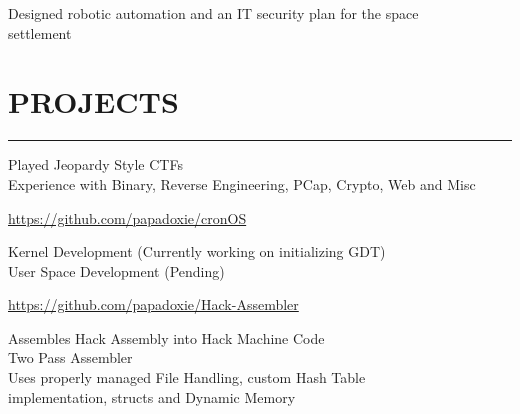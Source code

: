 \documentclass[]{resume}
\begin{document}
\begin{minipage}[t]{0.66\textwidth}
     
    \vspace{4pt}
    \begin{minipage}{0.85\textwidth\vspace{4pt}}
        Designed robotic automation and an IT security plan for the space\\settlement
    \end{minipage}



    \section{PROJECTS}
    \noindent\rule{12.80cm}{0.4pt}

     
    \vspace{4pt}
    \begin{minipage}{0.85\textwidth\vspace{2pt}}
        Played Jeopardy Style CTFs\\
        Experience with Binary, Reverse Engineering, PCap, Crypto, Web and Misc\\
    \end{minipage}

    \vspace{4pt}
     
    \href{https://github.com/papadoxie/Operating-System}{https://github.com/papadoxie/cronOS}\\
    \vspace{4pt}
    \begin{minipage}{0.85\textwidth\vspace{2pt}}
        Kernel Development (Currently working on initializing GDT)\\
        User Space Development (Pending)\\
    \end{minipage}

    \vspace{4pt}
     
    \href{https://github.com/papadoxie/Hack-Assembler}{https://github.com/papadoxie/Hack-Assembler}\\
    \vspace{4pt}
    \begin{minipage}{0.85\textwidth\vspace{2pt}}
        Assembles Hack Assembly into Hack Machine Code\\
        Two Pass Assembler\\
        Uses properly managed File Handling, custom Hash Table\\implementation, structs and Dynamic Memory
    \end{minipage}

\end{minipage}
\end{document}
